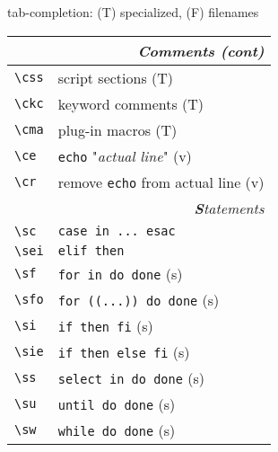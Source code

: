 \documentclass[oneside,11pt,landscape,DIV16]{scrartcl}
\begin{document}
\begin{multicols}{3}
\begin{center}
\begin{minipage}[b]{72mm}
{tab-completion: {\normalsize (T)} specialized,
{\normalsize (F)} filenames
}%
\end{minipage}
%
\begin{tabular}[]{|p{11mm}|p{60mm}|}
\hline
\multicolumn{2}{|r|}{\textsl{\textbf{C}omments (cont)}}                       \\[1.0ex]
\hline     \verb'\css'  & script sections                       \hfill (T)\\
\hline     \verb'\ckc'  & keyword comments                      \hfill (T)\\
\hline     \verb'\cma'  & plug-in macros                        \hfill (T)\\
%
\hline     \verb'\ce'   & \texttt{echo} "\textsl{actual line}"  \hfill (v)\\
\hline     \verb'\cr'   & remove \texttt{echo} from actual line \hfill (v)\\
\hline
\hline
\multicolumn{2}{|r|}{\textsl{\textbf{S}tatements}}                    \\[1.0ex]
\hline \verb'\sc'  & \verb'case in ... esac'               \\
\hline \verb'\sei' & \verb'elif then'                      \\
\hline \verb'\sf'  & \verb'for in do done'                 \hfill (s)\\
\hline \verb'\sfo' & \verb'for ((...)) do done'            \hfill (s)\\
\hline \verb'\si'  & \verb'if then fi'                     \hfill (s)\\
\hline \verb'\sie' & \verb'if then else fi'                \hfill (s)\\
\hline \verb'\ss'  & \verb'select in do done'              \hfill (s)\\
\hline \verb'\su'  & \verb'until do done'                  \hfill (s)\\
\hline \verb'\sw'  & \verb'while do done'                  \hfill (s)\\

\end{tabular}
\end{center}
\end{multicols}
\end{document}
